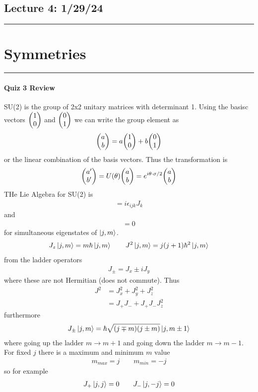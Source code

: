 \documentclass[../main.tex]{subfiles}
\begin{document}
\newpage
\subsection*{Lecture 4: \hfill  1/29/24}
\hrule \vspace{10px}
\section{Symmetries}
\hrule \vspace{10px}

\paragraph{Quiz 3 Review}
SU(2) is the group of 2x2 unitary matrices with determinant 1. Using the basisc vectors
$\mqty(1 \\ 0)$ and $\mqty(0 \\ 1)$ we can write the group element as
\begin{align*}
    \mqty(a \\ b) = a \mqty(1 \\ 0) + b \mqty(0 \\ 1)
\end{align*}
or the linear combination of the basis vectors. Thus the transformation is
\begin{align*}
    \mqty(a' \\ b') = U(\theta) \mqty(a \\ b) = e^{i\vb{\theta} \cdot \vb{\sigma} / 2} \mqty(a \\ b)
\end{align*}
THe Lie Algebra for SU(2) is
\begin{align*}
    [J_i, J_j] = i \epsilon_{ijk} J_k
\end{align*}
and
\begin{align*}
    [J^2, J_i] = 0
\end{align*}
for simultaneous eigenstates of $\ket{j,m}$.
\begin{align*}
    J_z \ket{j,m} = m\hbar \ket{j,m} \qquad
    J^2 \ket{j,m} = j(j+1)\hbar^2 \ket{j,m}
\end{align*}
from the ladder operators
\begin{align*}
    J_\pm = J_x \pm i J_y
\end{align*}
where these are not Hermitian (does not commute). Thus
\begin{align*}
    J^2 &= J_x^2 + J_y^2 + J_z^2 \\
    &= J_+ J_- + J_+ J_- J_z^2
\end{align*}
furthermore
\begin{align*}
    J_\pm \ket{j,m} = \hbar \sqrt{(j \mp m)(j \pm m)} \ket{j, m \pm 1}
\end{align*}
where going up the ladder $m \rightarrow m + 1$ and going down the ladder $m \rightarrow m - 1$.
For fixed $j$ there is a maximum and minimum $m$ value
\begin{align*}
    m_{max} = j \qquad m_{min} = -j
\end{align*}
so for example
\begin{align*}
    J_+ \ket{j,j} = 0 \qquad J_- \ket{j,-j} = 0
\end{align*}
\end{document}
